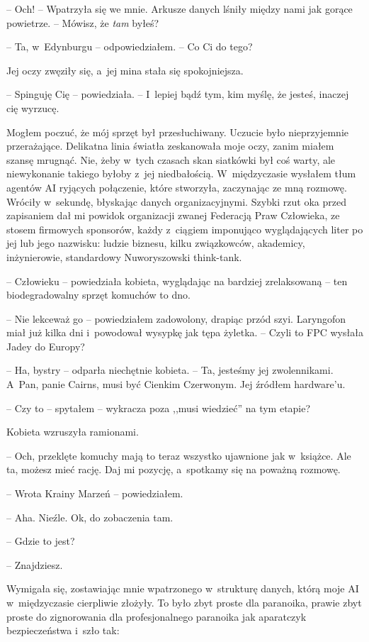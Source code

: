 \documentclass[oneside,polish,12pt,sfheadings]{mwbk}
\begin{document}
-- Och! -- Wpatrzyła się we mnie. Arkusze danych lśniły między nami jak
gorące powietrze. -- Mówisz, że \emph{tam } byłeś?

-- Ta, w~Edynburgu -- odpowiedziałem. -- Co Ci do tego?

Jej oczy zwęziły się, a~jej mina stała się spokojniejsza.

-- Spinguję Cię -- powiedziała. -- I~lepiej bądź tym, kim myślę, że jesteś,
inaczej cię wyrzucę.

Mogłem poczuć, że mój sprzęt był przesłuchiwany. Uczucie było
nieprzyjemnie przerażające. Delikatna linia światła zeskanowała moje
oczy, zanim miałem szansę mrugnąć. Nie, żeby w~tych czasach skan
siatkówki był coś warty, ale niewykonanie takiego byłoby z~jej
niedbałością. W~międzyczasie wysłałem tłum agentów AI ryjących
połączenie, które stworzyła, zaczynając ze mną rozmowę. Wróciły w~sekundę, błyskając danych organizacyjnymi. Szybki rzut oka przed
zapisaniem dał mi powidok organizacji zwanej Federacją Praw Człowieka,
ze stosem firmowych sponsorów, każdy z~ciągiem imponująco wyglądających
liter po jej lub jego nazwisku: ludzie biznesu, kilku związkowców,
akademicy, inżynierowie, standardowy Nuworyszowski think-tank.

-- Człowieku -- powiedziała kobieta, wyglądając na bardziej zrelaksowaną -- ten biodegradowalny sprzęt komuchów to dno.

-- Nie lekceważ go -- powiedziałem zadowolony, drapiąc przód szyi.
Laryngofon miał już kilka dni i~powodował wysypkę jak tępa żyletka. --
Czyli to FPC wysłała Jadey do Europy?

-- Ha, bystry -- odparła niechętnie kobieta. -- Ta, jesteśmy jej
zwolennikami. A~Pan, panie Cairns, musi być Cienkim Czerwonym. Jej
źródłem hardware'u.

-- Czy to -- spytałem -- wykracza poza ,,musi wiedzieć'' na tym etapie?

Kobieta wzruszyła ramionami. 

-- Och, przeklęte komuchy mają to teraz
wszystko ujawnione jak w~książce. Ale ta, możesz mieć rację. Daj mi
pozycję, a~spotkamy się na poważną rozmowę.

-- Wrota Krainy Marzeń -- powiedziałem.

-- Aha. Nieźle. Ok, do zobaczenia tam.

-- Gdzie to jest?

-- Znajdziesz.

Wymigała się, zostawiając mnie wpatrzonego w~strukturę danych, którą
moje AI w~międzyczasie cierpliwie złożyły. To było zbyt proste dla
paranoika, prawie zbyt proste do zignorowania dla profesjonalnego
paranoika jak aparatczyk bezpieczeństwa i~szło tak:
\end{document}
